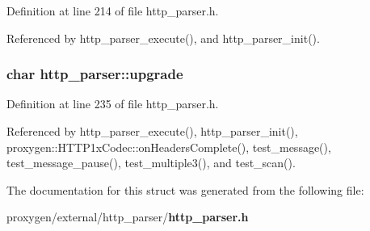 Definition at line 214 of file http\+\_\+parser.\+h.



Referenced by http\+\_\+parser\+\_\+execute(), and http\+\_\+parser\+\_\+init().

\subsubsection[{upgrade}]{\setlength{\rightskip}{0pt plus 5cm}char http\+\_\+parser\+::upgrade}\label{structhttp__parser_a44dee51997fc21443fd91bfc2f0be000}


Definition at line 235 of file http\+\_\+parser.\+h.



Referenced by http\+\_\+parser\+\_\+execute(), http\+\_\+parser\+\_\+init(), proxygen\+::\+H\+T\+T\+P1x\+Codec\+::on\+Headers\+Complete(), test\+\_\+message(), test\+\_\+message\+\_\+pause(), test\+\_\+multiple3(), and test\+\_\+scan().



The documentation for this struct was generated from the following file\+:\begin{DoxyCompactItemize}
\item 
proxygen/external/http\+\_\+parser/{\bf http\+\_\+parser.\+h}\end{DoxyCompactItemize}
